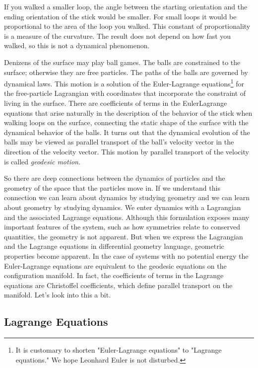 \documentclass[11pt]{article}
\begin{document}
If you walked a smaller loop, the angle between the starting orientation and the
ending orientation of the stick would be smaller. For small loops it would be
proportional to the area of the loop you walked. This constant of
proportionality is a measure of the curvature. The result does not depend on how
fast you walked, so this is not a dynamical phenomenon.

Denizens of the surface may play ball games. The balls are constrained to the
surface; otherwise they are free particles. The paths of the balls are governed
by dynamical laws. This motion is a solution of the Euler-Lagrange
equations\footnote{It is customary to shorten "Euler-Lagrange equations" to "Lagrange
equations." We hope Leonhard Euler is not disturbed.} for the free-particle Lagrangian with coordinates that
incorporate the constraint of living in the surface. There are coefficients of
terms in the EulerLagrange equations that arise naturally in the description of
the behavior of the stick when walking loops on the surface, connecting the
static shape of the surface with the dynamical behavior of the balls. It turns
out that the dynamical evolution of the balls may be viewed as parallel
transport of the ball's velocity vector in the direction of the velocity vector.
This motion by parallel transport of the velocity is called \emph{geodesic motion}.

So there are deep connections between the dynamics of particles and the geometry
of the space that the particles move in. If we understand this connection we can
learn about dynamics by studying geometry and we can learn about geometry by
studying dynamics. We enter dynamics with a Lagrangian and the associated
Lagrange equations. Although this formulation exposes many important features of
the system, such as how symmetries relate to conserved quantities, the geometry
is not apparent. But when we express the Lagrangian and the Lagrange equations
in differential geometry language, geometric properties become apparent. In the
case of systems with no potential energy the Euler-Lagrange equations are
equivalent to the geodesic equations on the configuration manifold. In fact, the
coefficients of terms in the Lagrange equations are Christoffel coefficients,
which define parallel transport on the manifold. Let's look into this a bit.

\subsection{Lagrange Equations}
\label{sec:orgf137609}
\end{document}
